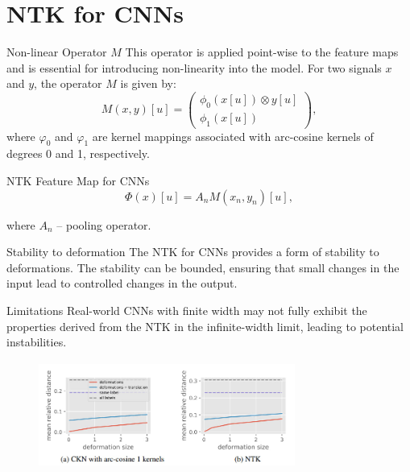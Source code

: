 \documentclass{beamer}
\begin{document}
\section{NTK for CNNs}
\begin{frame}
\begin{block}{Non-linear Operator $M$}
This operator is applied point-wise to the feature maps and is essential for introducing non-linearity into the model. For two signals \( x \) and \( y \), the operator \( M \) is given by:
\[M(x, y)[u] = \begin{pmatrix}
\phi_0(x[u]) \otimes y[u] \\
\phi_1(x[u])
\end{pmatrix},\]
where $\varphi_0$ and $\varphi_1$ are kernel mappings associated with arc-cosine kernels of degrees 0 and 1, respectively.
\end{block}

\begin{block}{NTK Feature Map for CNNs}
\[\Phi(x)[u] = A_n M(x_n, y_n)[u],\]

where $A_n$ -- pooling operator.
\end{block}
\end{frame}
\begin{frame}
\begin{block}{Stability to deformation}
The NTK for CNNs provides a form of stability to deformations. The stability can be bounded, ensuring that small changes in the input lead to controlled changes in the output.
\end{block}

\begin{block}{Limitations}
Real-world CNNs with finite width may not fully exhibit the properties derived from the NTK in the infinite-width limit, leading to potential instabilities.
\end{block}

\begin{figure}
  \centering
  \includegraphics[width=0.75\textwidth, height=35mm]{Pictures/ntk.jpg}
\end{figure}
\end{frame}
\end{document}
